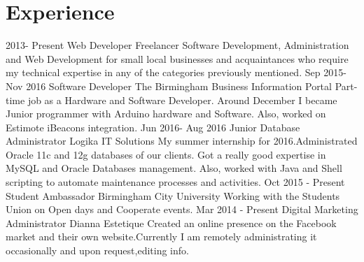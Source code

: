 \documentclass[]{friggeri-cv}
\begin{document}
\section{Experience}
\begin{entrylist}
  \entry
  {2013- Present}
  {Web Developer}
  {Freelancer}
  {Software Development, Administration and Web Development for small local businesses and acquaintances who require my technical expertise in any of the categories previously mentioned.}
  \entry
  {Sep 2015- Nov 2016}
  {Software Developer}
  {The Birmingham Business Information Portal}
  {Part-time job as a Hardware and Software Developer. Around December I became Junior programmer with Arduino hardware and Software. Also, worked on Estimote iBeacons integration.}
  \entry
  {Jun 2016- Aug 2016}
  {Junior Database Administrator}
  {Logika IT Solutions}
  {My summer internship for 2016.Administrated Oracle 11c and 12g databases of our clients. Got a really good expertise in MySQL and Oracle Databases management. Also, worked with Java and Shell scripting to automate maintenance processes and activities.}
  \entry
  {Oct 2015 - Present}
  {Student Ambassador}
  {Birmingham City University}
  {Working with the Students Union on Open days and Cooperate events.}
  \entry
  {Mar 2014 - Present}
  {Digital Marketing Administrator}
  {Dianna Estetique}
  {Created an online presence on the Facebook market and their own website.Currently I am remotely administrating it occasionally and upon request,editing info.}
\end{entrylist}
\\
\end{document}

